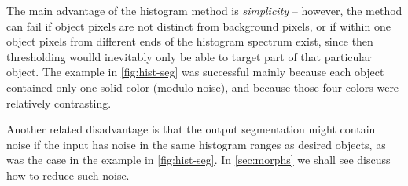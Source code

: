 The main advantage of the histogram method is \textit{simplicity} --
however, the method can fail if object pixels are not distinct from background
pixels, or if within one object pixels from different ends of the histogram
spectrum exist, since then thresholding woulld inevitably only be able to target
part of that particular object. The example in \cref{fig:hist-seg} was
successful mainly because each object contained only one solid color
(modulo noise), and because those four colors were relatively contrasting.

Another related disadvantage is that the output segmentation might contain noise
if the input has noise in the same histogram ranges as desired objects, as was
the case in the example in \cref{fig:hist-seg}. In \cref{sec:morphs} we shall
see discuss how to reduce such noise.

\sectend
